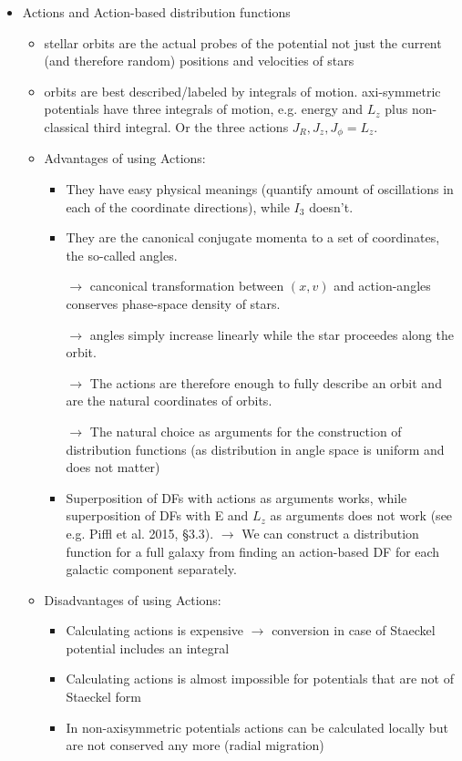 \begin{itemize}
\item Actions and Action-based distribution functions
\begin{itemize}
\item stellar orbits are the actual probes of the potential not just the current (and therefore random) positions and velocities of stars
\item orbits are best described/labeled by integrals of motion. axi-symmetric potentials have three integrals of motion, e.g. energy and $L_z$ plus non-classical third integral. Or the three actions $J_R, J_z, J_\phi=L_z$.
\item Advantages of using Actions: 
\begin{itemize}
\item They have easy physical meanings (quantify amount of oscillations in each of the coordinate directions), while $I_3$ doesn't.
\item They are the canonical conjugate momenta to a set of coordinates, the so-called angles.
\item[$\rightarrow$] canconical transformation between $(x,v)$ and action-angles conserves phase-space density of stars.
\item[$\rightarrow$] angles simply increase linearly while the star proceedes along the orbit.
\item[$\rightarrow$] The actions are therefore enough to fully describe an orbit and are the natural coordinates of orbits.
\item[$\rightarrow$] The natural choice as arguments for the construction of distribution functions (as distribution in angle space is uniform and does not matter)
\item Superposition of DFs with actions as arguments works, while superposition of DFs with E and $L_z$ as arguments does not work (see e.g. Piffl et al. 2015, §3.3). $\rightarrow$ We can construct a distribution function for a full galaxy from finding an action-based DF for each galactic component separately.
\end{itemize}
\item Disadvantages of using Actions:
\begin{itemize}
\item Calculating actions is expensive $\rightarrow$ conversion in case of Staeckel potential includes an integral
\item Calculating actions is almost impossible for potentials that are not of Staeckel form
\item In non-axisymmetric potentials actions can be calculated locally but are not conserved any more (radial migration)

\end{itemize}
\end{itemize}
\end{itemize}
